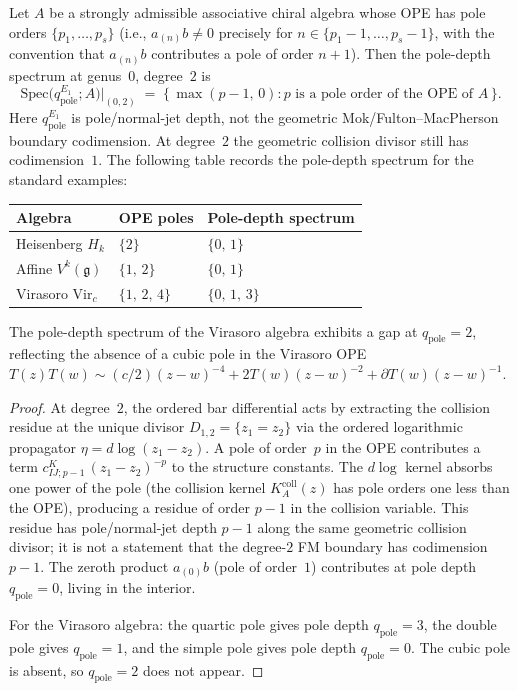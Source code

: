 \begin{theorem}
\ClaimStatusProvedHere
\label{thm:ordered-depth-spectrum}
Let $A$ be a strongly admissible associative chiral algebra
whose OPE has pole orders $\{p_1, \ldots, p_s\}$
\textup{(}i.e., $a_{(n)}b \neq 0$ precisely for $n \in \{p_1{-}1, \ldots, p_s{-}1\}$,
with the convention that $a_{(n)}b$ contributes a pole of order $n{+}1$\textup{)}.
Then the pole-depth spectrum at genus~$0$, degree~$2$ is
\begin{equation}\label{eq:depth-spectrum}
\mathrm{Spec}\bigl(q_{\mathrm{pole}}^{E_1}; A\bigr)\big|_{(0,2)}
\;=\;
\bigl\{\,\max(p-1,\,0) : p \text{ is a pole order of the OPE of } A\,\bigr\}.
\end{equation}
Here $q_{\mathrm{pole}}^{E_1}$ is pole/normal-jet depth, not the
geometric Mok/Fulton--MacPherson boundary codimension. At degree~$2$
the geometric collision divisor still has codimension~$1$.
The following table records the pole-depth spectrum for the standard
examples:
\begin{center}
\renewcommand{\arraystretch}{1.2}
\begin{tabular}{lll}
\textbf{Algebra} & \textbf{OPE poles} & \textbf{Pole-depth spectrum} \\
\hline
Heisenberg $H_k$ & $\{2\}$ & $\{0,\,1\}$ \\
Affine $V^k(\mathfrak{g})$ & $\{1,\,2\}$ & $\{0,\,1\}$ \\
Virasoro $\mathrm{Vir}_c$ & $\{1,\,2,\,4\}$ & $\{0,\,1,\,3\}$
\end{tabular}
\end{center}
The pole-depth spectrum of the Virasoro algebra exhibits a gap at
$q_{\mathrm{pole}}=2$,
reflecting the absence of a cubic pole in the Virasoro OPE
$T(z)T(w) \sim (c/2)(z{-}w)^{-4} + 2T(w)(z{-}w)^{-2} + \partial T(w)(z{-}w)^{-1}$.
\end{theorem}

\begin{proof}
At degree~$2$, the ordered bar differential acts by extracting the
collision residue at the unique divisor $D_{1,2} = \{z_1 = z_2\}$ via
the ordered logarithmic propagator $\eta = d\log(z_1 - z_2)$.
A pole of order~$p$ in the OPE contributes a term
$c^K_{IJ;p-1}\,(z_1 - z_2)^{-p}$ to the structure constants.
The $d\log$ kernel absorbs one power of the pole
(the collision kernel $K_A^{\mathrm{coll}}(z)$ has pole orders one less than the OPE),
producing a residue of order $p - 1$ in the collision variable.
This residue has pole/normal-jet depth $p{-}1$ along the same
geometric collision divisor; it is not a statement that the degree-$2$
FM boundary has codimension $p{-}1$. The zeroth product
$a_{(0)}b$ (pole of order~$1$) contributes at pole depth
$q_{\mathrm{pole}}=0$,
living in the interior.

For the Virasoro algebra: the quartic pole gives pole depth
$q_{\mathrm{pole}}=3$, the double pole gives
$q_{\mathrm{pole}}=1$, and the simple pole gives pole depth
$q_{\mathrm{pole}}=0$. The cubic pole is absent, so
$q_{\mathrm{pole}}=2$ does not appear.
\end{proof}

